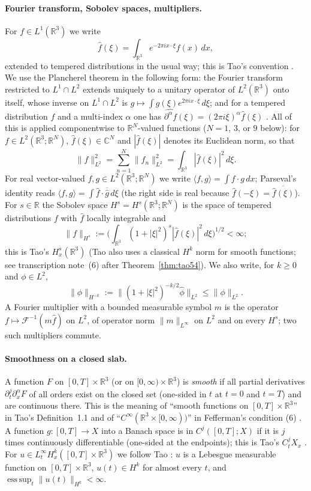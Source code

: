 \documentclass[11pt]{article}
\theoremstyle{definition}
\theoremstyle{plain}
\newcommand{\R}{\mathbb R}
\newcommand{\norm}[1]{\lVert #1\rVert}
\begin{document}
\paragraph{Fourier transform, Sobolev spaces, multipliers.}
For $f\in L^1(\R^3)$ we write
\[
 \widehat f(\xi)=\int_{\R^3}e^{-2\pi ix\cdot\xi}f(x)\,dx ,
\]
extended to tempered distributions in the usual way; this is Tao's
convention \cite[\S2, p.~35]{Tao2013}.  We use the
Plancherel theorem in the following form: the Fourier transform restricted
to $L^1\cap L^2$ extends uniquely to a unitary operator of $L^2(\R^3)$
onto itself, whose inverse on $L^1\cap L^2$ is $g\mapsto\int
g(\xi)e^{2\pi ix\cdot\xi}\,d\xi$; and for a tempered distribution $f$ and
a multi-index $\alpha$ one has $\widehat{\partial^\alpha f}(\xi)=(2\pi
i\xi)^\alpha\widehat f(\xi)$ \cite[Ch.~I]{SteinWeiss1971}.  All of this is
applied componentwise to $\R^N$-valued functions ($N=1$, $3$, or $9$
below): for $f\in L^2(\R^3;\R^N)$, $\widehat f(\xi)\in\mathbb C^N$ and
$|\widehat f(\xi)|$ denotes its Euclidean norm, so that
\[
 \norm f_{L^2}^2=\sum_{n=1}^N\norm{f_n}_{L^2}^2=\int_{\R^3}|\widehat f(\xi)|^2
 \,d\xi .
\]
For real vector-valued $f,g\in L^2(\R^3;\R^N)$ we write $\langle
f,g\rangle=\int f\cdot g\,dx$; Parseval's identity reads $\langle
f,g\rangle=\int\widehat f\cdot\overline{\widehat g}\,d\xi$ (the right side
is real because $\widehat f(-\xi)=\overline{\widehat f(\xi)}$).
For $s\in\R$ the Sobolev space $H^s=H^s(\R^3;\R^N)$ is the space of
tempered distributions $f$ with $\widehat f$ locally integrable and
\[
 \norm f_{H^s}:=\Big(\int_{\R^3}(1+|\xi|^2)^s|\widehat f(\xi)|^2\,d\xi
 \Big)^{1/2}<\infty ;
\]
this is Tao's $H^s_x(\R^3)$ \cite[\S2, p.~36]{Tao2013} (Tao also uses a
classical $H^k$ norm for smooth functions; see transcription note~(6)
after Theorem~\ref{thm:tao54}).  We also write, for $k\geq0$ and
$\phi\in L^2$,
\[
 \norm\phi_{H^{-k}}:=\norm{(1+|\xi|^2)^{-k/2}\widehat\phi}_{L^2}
 \leq\norm\phi_{L^2}.
\]
A Fourier multiplier with a bounded measurable symbol $m$ is the operator
$f\mapsto\mathcal F^{-1}(m\widehat f)$ on $L^2$, of operator norm
$\norm m_{L^\infty}$ on $L^2$ and on every $H^s$; two such multipliers
commute.

\paragraph{Smoothness on a closed slab.}
A function $F$ on $[0,T]\times\R^3$ (or on $[0,\infty)\times\R^3$) is
\emph{smooth} if all partial derivatives $\partial_t^j\partial_x^\alpha F$
of all orders exist on the closed set (one-sided in $t$ at $t=0$ and
$t=T$) and are continuous there.  This is the meaning of ``smooth
functions on $[0,T]\times\R^3$'' in Tao's Definition~1.1
\cite[p.~26]{Tao2013} and of ``$C^\infty(\R^3\times[0,\infty))$'' in
Fefferman's condition (6) \cite{Fefferman2000}.  A function
$g:[0,T]\to X$ into a Banach space is in $C^j([0,T];X)$ if it is $j$ times
continuously differentiable (one-sided at the endpoints); this is Tao's
$C^j_tX_x$ \cite[p.~37]{Tao2013}.  For $u\in L^\infty_tH^k_x([0,T]\times
\R^3)$ we follow Tao \cite[p.~37]{Tao2013}: $u$ is a Lebesgue measurable
function on $[0,T]\times\R^3$, $u(t)\in H^k$ for almost every $t$, and
$\operatorname{ess\,sup}_t\norm{u(t)}_{H^k}<\infty$.
\end{document}
